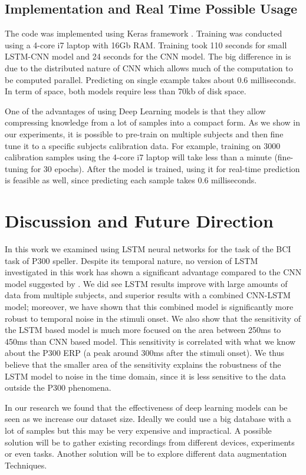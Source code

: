 \documentclass[
12pt, %
english, %
doublespacing, %
headsepline, %
]{MastersDoctoralThesis} %
\begin{document}
\section{Implementation and Real Time Possible Usage}
The code was implemented using Keras framework \cite{chollet2015keras}. Training was conducted using a 4-core i7 laptop with 16Gb RAM. Training took 110 seconds for small LSTM-CNN model and 24 seconds for the CNN model. The big difference in is due to the distributed nature of  CNN which allows much of the computation to be computed parallel. Predicting on single example takes about 0.6 milliseconds. In term of space, both models require less than 70kb of disk space.

One of the advantages of using Deep Learning models is that they allow compressing knowledge from a lot of samples into a compact form. As we show in our experiments, it is possible to pre-train on multiple subjects and then fine tune it to a specific subjects calibration data. For example, training on 3000 calibration samples using the 4-core i7 laptop will take less than a minute (fine-tuning for 30 epochs). After the model is trained, using it for real-time prediction is feasible as well, since predicting each sample takes 0.6 milliseconds.

\chapter{Discussion and Future Direction}
In this work we examined using LSTM neural networks for the task of the BCI task of P300 speller. Despite its temporal nature, no version of LSTM investigated in this work has shown a significant advantage compared to the CNN model suggested by \cite{P300_CNN}. We did see LSTM results improve with large amounts of data from multiple subjects, and superior results with a combined CNN-LSTM model; moreover, we have shown that this combined model is significantly more robust to temporal noise in the stimuli onset. We also show that the sensitivity of the LSTM based model is much more focused on the area between 250ms to 450ms than CNN based model. This sensitivity is correlated with what we know about the P300 ERP (a peak around 300ms after the stimuli onset). We thus believe that the smaller area of the sensitivity explains the robustness of the LSTM model to noise in the time domain, since it is less sensitive to the data outside the P300 phenomena. 

In our research we found that the effectiveness of deep learning  models can be seen as we increase our dataset size. Ideally we could use a big database with a lot of samples but this may be very expensive and impractical. A possible solution will be to gather existing recordings from different devices, experiments or even tasks. Another solution will be to explore different data augmentation Techniques. 
\end{document}

